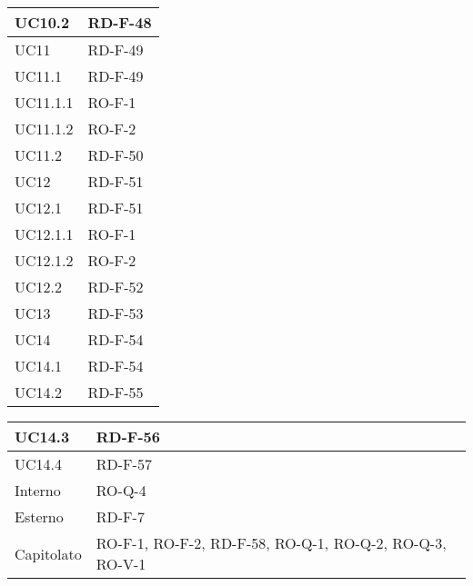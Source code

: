 \begin{center}
\begin{tabular}{ |m{8em}|m{13em}| }
    \hline
    UC10.2      &   RD-F-48 \\
    \hline
    UC11        &   RD-F-49 \\
    \hline
    UC11.1      &   RD-F-49 \\
    \hline
    UC11.1.1    &   RO-F-1 \\
    \hline
    UC11.1.2    &   RO-F-2 \\
    \hline
    UC11.2      &   RD-F-50 \\
    \hline
    UC12        &   RD-F-51 \\
    \hline
    UC12.1      &   RD-F-51 \\
    \hline
    UC12.1.1    &   RO-F-1 \\
    \hline
    UC12.1.2    &   RO-F-2 \\
    \hline
    UC12.2      &   RD-F-52 \\
    \hline
    UC13        &   RD-F-53 \\
    \hline
    UC14        &   RD-F-54 \\
    \hline
    UC14.1      &   RD-F-54 \\
    \hline
    UC14.2      &   RD-F-55 \\
    \hline
    \end{tabular}
    \newpage
    \begin{tabular}{ |m{8em}|m{13em}| }
    \hline
    UC14.3      &   RD-F-56 \\
    \hline
    UC14.4      &   RD-F-57 \\
    \hline
    Interno     &   RO-Q-4 \\
    \hline
    Esterno     &   RD-F-7 \\
    \hline
    Capitolato  &   RO-F-1, RO-F-2, RD-F-58, RO-Q-1, RO-Q-2, RO-Q-3, RO-V-1 \\
    \hline
\end{tabular}
\end{center}
